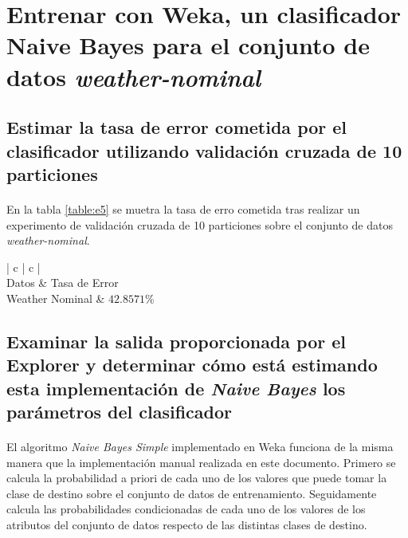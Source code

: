 \documentclass{article}
\begin{document}
	\section{Entrenar con Weka, un clasificador Naive Bayes para el conjunto de datos \emph{weather-nominal}}
	\label{sec:e5}

		\subsection{Estimar la tasa de error cometida por el clasificador utilizando validación cruzada de 10 particiones}

			\paragraph{}
			En la tabla \ref{table:e5} se muetra la tasa de erro cometida tras realizar un experimento de validación cruzada de 10 particiones sobre el conjunto de datos \emph{weather-nominal}.

			\begin{table}[H]
				\centering
				\begin{tabu}{ | c | c | }
					\hline
					 \\ \hline
					Datos	& Tasa de Error \\ \hline
					Weather Nominal	& $42.8571\%$	\\
					\hline
				\end{tabu}
				\caption{Validación Cruzada de 10 particiones con Naive Bayes}
				\label{table:e5}
			\end{table}

		\subsection{Examinar la salida proporcionada por el Explorer y determinar cómo está estimando esta implementación de \emph{Naive Bayes} los parámetros del clasificador}

			\paragraph{}
			El algoritmo \emph{Naive Bayes Simple} implementado en Weka funciona de la misma manera que la implementación manual realizada en este documento. Primero se calcula la probabilidad a priori de cada uno de los valores que puede tomar la clase de destino sobre el conjunto de datos de entrenamiento. Seguidamente calcula las probabilidades condicionadas de cada uno de los valores de los atributos del conjunto de datos respecto de las distintas clases de destino.
\end{document}
